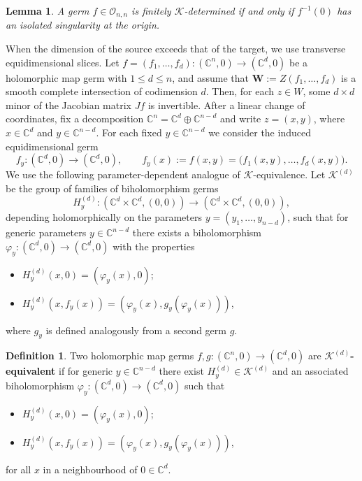 \documentclass[10pt,twoside]{amsart}
\numberwithin{equation}{section}
\newtheorem{lemma}[proposition]{Lemma}
\theoremstyle{definition}
\newtheorem{definition}[proposition]{Definition}
\theoremstyle{remark}
\newcommand{\W}{\mathbf{W}}
\begin{document}
\begin{lemma}
A germ $f\in\mathcal{O}_{n,n}$ is finitely $\mathcal{K}$-determined if and only if $f^{-1}(0)$ has an isolated singularity at the origin.
\end{lemma}

When the dimension of the source exceeds that of the target, we use transverse equidimensional slices.
Let $f=(f_1,\ldots,f_d):(\mathbb{C}^n,0)\to(\mathbb{C}^d,0)$ be a holomorphic map germ with $1\leq d\leq n$, and assume that
$
\W:=Z(f_1,\ldots,f_d)
$
is a smooth complete intersection of codimension $d$.
Then, for each $z\in W$, some $d\times d$ minor of the Jacobian matrix $Jf$ is invertible.
After a linear change of coordinates, fix a decomposition $\mathbb{C}^n=\mathbb{C}^d\oplus\mathbb{C}^{n-d}$ and write $z=(x,y)$, where $x\in\mathbb{C}^d$ and $y\in\mathbb{C}^{n-d}$.
For each fixed $y\in\mathbb{C}^{n-d}$ we consider the induced equidimensional germ
\[
f_y:(\mathbb{C}^d,0)\longrightarrow (\mathbb{C}^d,0),
\qquad
f_y(x):=f(x,y)=\bigl(f_1(x,y),\ldots,f_d(x,y)\bigr).
\]
We use the following parameter-dependent analogue of $\mathcal K$-equivalence.
Let $\mathcal{K}^{(d)}$ be the group of families of biholomorphism germs
\[
H_y^{(d)}:(\mathbb{C}^d\times \mathbb{C}^d,(0,0))\longrightarrow (\mathbb{C}^d\times \mathbb{C}^d,(0,0)),
\]
depending holomorphically on the parameters $y=(y_1,\ldots,y_{n-d})$, such that for generic parameters $y\in\mathbb{C}^{n-d}$ there exists a biholomorphism
$\varphi_y:(\mathbb{C}^d,0)\to (\mathbb{C}^d,0)$ with the properties
\begin{itemize}
\item[(i)] $H_y^{(d)}(x,0)=(\varphi_y(x),0)$;
\item[(ii)] $H_y^{(d)}(x,f_y(x))=(\varphi_y(x), g_y(\varphi_y(x)))$,
\end{itemize}
where $g_y$ is defined analogously from a second germ $g$.

\begin{definition}
Two holomorphic map germs $f,g:(\mathbb{C}^n,0)\to(\mathbb{C}^d,0)$ are \textbf{$\mathcal{K}^{(d)}$-equivalent} if for generic $y\in\mathbb{C}^{n-d}$ there exist
$H_y^{(d)}\in \mathcal{K}^{(d)}$ and an associated biholomorphism $\varphi_y:(\mathbb{C}^d,0)\to(\mathbb{C}^d,0)$ such that
\begin{itemize}
\item[(i)] $H_y^{(d)}(x,0)=(\varphi_y(x),0)$;
\item[(ii)] $H_y^{(d)}(x,f_y(x))=(\varphi_y(x), g_y(\varphi_y(x)))$,
\end{itemize}
for all $x$ in a neighbourhood of $0\in\mathbb{C}^d$.
\end{definition}
\end{document}
